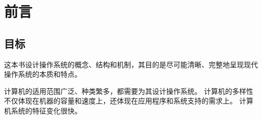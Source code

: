 
\chapter{前言}
{
    \section{目标}
    {
        这本书设计操作系统的概念、结构和机制，其目的是尽可能清晰、完整地呈现现代操作系统的本质和特点。

        计算机的适用范围广泛、种类繁多，都需要为其设计操作系统。
        计算机的多样性不仅体现在机器的容量和速度上，还体现在应用程序和系统支持的需求上。
        计算机系统的特征变化很快。
    }
}

\cleardoublepage

\endinput
